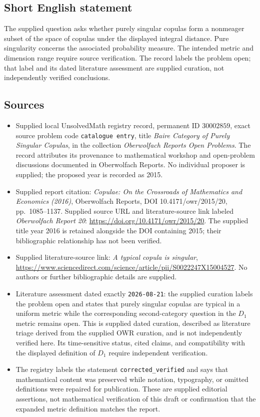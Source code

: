 \documentclass[11pt]{article}
\begin{document}
\subsection{Short English statement}
The supplied question asks whether purely singular copulas form a nonmeager subset of the space of copulas under the displayed integral distance. Pure singularity concerns the associated probability measure. The intended metric and dimension range require source verification. The record labels the problem open; that label and its dated literature assessment are supplied curation, not independently verified conclusions.
\subsection{Sources}
\begin{itemize}
\item Supplied local UnsolvedMath registry record, permanent ID \(30002859\), exact source problem code \texttt{catalogue entry}, title \emph{Baire Category of Purely Singular Copulas}, in the collection \emph{Oberwolfach Reports Open Problems}. The record attributes its provenance to mathematical workshop and open-problem discussions documented in Oberwolfach Reports. No individual proposer is supplied; the proposed year is recorded as 2015.
\item Supplied report citation: \emph{Copulae: On the Crossroads of Mathematics and Economics (2016)}, Oberwolfach Reports, DOI 10.4171/owr/2015/20, pp.~1085--1137. Supplied source URL and literature-source link labeled \emph{Oberwolfach Report 20}: \url{https://doi.org/10.4171/owr/2015/20}. The supplied title year 2016 is retained alongside the DOI containing 2015; their bibliographic relationship has not been verified.
\item Supplied literature-source link: \emph{A typical copula is singular}, \url{https://www.sciencedirect.com/science/article/pii/S0022247X15004527}. No authors or further bibliographic details are supplied.
\item Literature assessment dated exactly \texttt{2026-08-21}: the supplied curation labels the problem open and states that purely singular copulas are typical in a uniform metric while the corresponding second-category question in the \(D_1\) metric remains open. This is supplied dated curation, described as literature triage derived from the supplied OWR curation, and is not independently verified here. Its time-sensitive status, cited claims, and compatibility with the displayed definition of \(D_1\) require independent verification.
\item The registry labels the statement \texttt{corrected\_verified} and says that mathematical content was preserved while notation, typography, or omitted definitions were repaired for publication. These are supplied editorial assertions, not mathematical verification of this draft or confirmation that the expanded metric definition matches the report.
\end{itemize}
\end{document}
